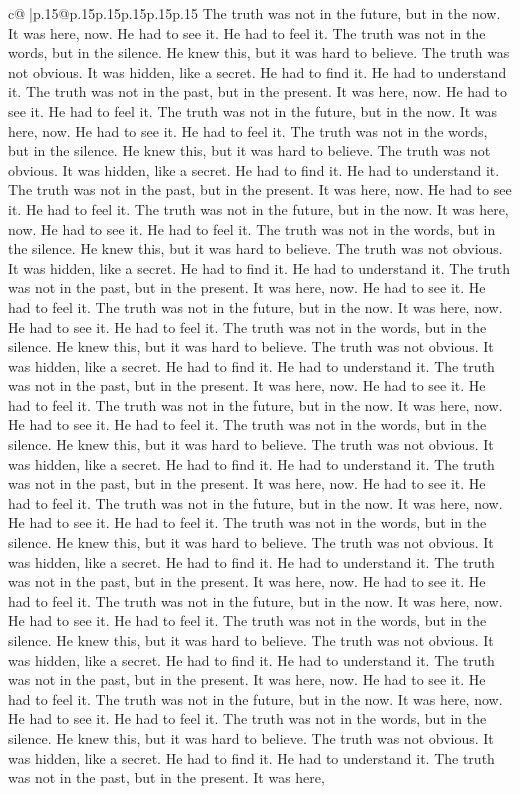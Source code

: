 \documentclass{article}
\begin{document}
{\begin{supertabular}{c@{$\;$}|p{.15\linewidth}@{}p{.15\linewidth}p{.15\linewidth}p{.15\linewidth}p{.15\linewidth}p{.15\linewidth}}
{{{The truth was not in the future, but in the now. It was here, now. He had to see it. He had to feel it. The truth was not in the words, but in the silence. He knew this, but it was hard to believe. The truth was not obvious. It was hidden, like a secret. He had to find it. He had to understand it. The truth was not in the past, but in the present. It was here, now. He had to see it. He had to feel it. The truth was not in the future, but in the now. It was here, now. He had to see it. He had to feel it. The truth was not in the words, but in the silence. He knew this, but it was hard to believe. The truth was not obvious. It was hidden, like a secret. He had to find it. He had to understand it. The truth was not in the past, but in the present. It was here, now. He had to see it. He had to feel it. The truth was not in the future, but in the now. It was here, now. He had to see it. He had to feel it. The truth was not in the words, but in the silence. He knew this, but it was hard to believe. The truth was not obvious. It was hidden, like a secret. He had to find it. He had to understand it. The truth was not in the past, but in the present. It was here, now. He had to see it. He had to feel it. The truth was not in the future, but in the now. It was here, now. He had to see it. He had to feel it. The truth was not in the words, but in the silence. He knew this, but it was hard to believe. The truth was not obvious. It was hidden, like a secret. He had to find it. He had to understand it. The truth was not in the past, but in the present. It was here, now. He had to see it. He had to feel it. The truth was not in the future, but in the now. It was here, now. He had to see it. He had to feel it. The truth was not in the words, but in the silence. He knew this, but it was hard to believe. The truth was not obvious. It was hidden, like a secret. He had to find it. He had to understand it. The truth was not in the past, but in the present. It was here, now. He had to see it. He had to feel it. The truth was not in the future, but in the now. It was here, now. He had to see it. He had to feel it. The truth was not in the words, but in the silence. He knew this, but it was hard to believe. The truth was not obvious. It was hidden, like a secret. He had to find it. He had to understand it. The truth was not in the past, but in the present. It was here, now. He had to see it. He had to feel it. The truth was not in the future, but in the now. It was here, now. He had to see it. He had to feel it. The truth was not in the words, but in the silence. He knew this, but it was hard to believe. The truth was not obvious. It was hidden, like a secret. He had to find it. He had to understand it. The truth was not in the past, but in the present. It was here, now. He had to see it. He had to feel it. The truth was not in the future, but in the now. It was here, now. He had to see it. He had to feel it. The truth was not in the words, but in the silence. He knew this, but it was hard to believe. The truth was not obvious. It was hidden, like a secret. He had to find it. He had to understand it. The truth was not in the past, but in the present. It was here, }}}
\end{supertabular}}
\end{document}
